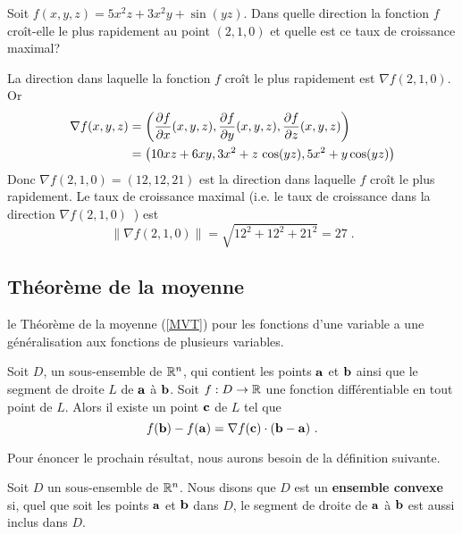 {

\begin{egg}
Soit $f(x,y,z) = 5x^2z+3x^2y+\sin(yz)$.  Dans quelle direction la fonction
$f$ croît-elle le plus rapidement au point $(2,1,0)$ et quelle est ce taux de
croissance maximal?

La direction dans laquelle la fonction $f$ croît le plus rapidement est
$\nabla f(2,1,0)$.  Or
\begin{align*}
\nabla f(x,y,z) &= \left(\frac{\partial f}{\partial x}(x,y,z), \frac{\partial f}{\partial y}(x,y,z), 
\frac{\partial f}{\partial z}(x,y,z) \right)\\
&=\left( 10xz +6xy, 3x^2 + z\,\cos(yz) , 5x^2 + y \cos(yz) \right)
\end{align*}
Donc $\nabla f(2,1,0) = (12, 12, 21)$ est la direction dans laquelle $f$
croît le plus rapidement.  Le taux de croissance maximal (i.e. le taux de
croissance dans la direction $\nabla f(2,1,0)$\ ) est
\[
\|\nabla f(2,1,0)\| = \sqrt{12^2+12^2 + 21^2} = 27 \; .
\]
\end{egg}

\subsection{Théorème de la moyenne}

le Théorème de la moyenne (\ref{MVT}) pour les fonctions d'une
variable a une généralisation aux fonctions de plusieurs variables.

\begin{theorem}
Soit $D$, un sous-ensemble de $\mathbb{R}^n$, qui contient les points
$\mathbf{a}$ et $\mathbf{b}$ ainsi que le segment de droite $L$ de $\mathbf{a}$
à $\mathbf{b}$.  Soit $f:D \to \mathbb{R}$ une fonction différentiable en tout
point de $L$.  Alors il existe un point $\mathbf{c}$ de $L$ tel que
\[
  f(\mathbf{b}) - f(\mathbf{a}) = \nabla f(\mathbf{c})\cdot (\mathbf{b}-\mathbf{a}) \ .
\]
\end{theorem}

Pour énoncer le prochain résultat, nous aurons besoin de la
définition suivante.

\begin{defn} 
Soit $D$ un sous-ensemble de $\mathbb{R}^n$.  Nous disons que $D$ est un
{\bfseries ensemble convexe} si, quel que soit les points $\mathbf{a}$
et $\mathbf{b}$ dans $D$, le segment de droite de $\mathbf{a}$ à
$\mathbf{b}$ est aussi inclus dans $D$.
\end{defn}

}
